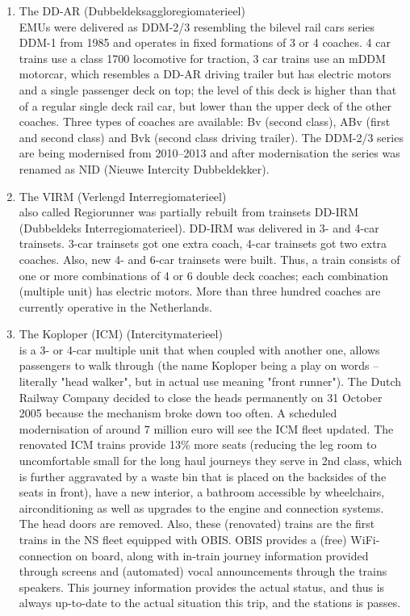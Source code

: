 \begin{enumerate}
    \item The DD-AR (Dubbeldeksaggloregiomaterieel) \\  EMUs were delivered as DDM-2/3 resembling the bilevel rail cars series DDM-1 from 1985 and operates in fixed formations of 3 or 4 coaches. 4 car trains use a class 1700 locomotive for traction, 3 car trains use an mDDM motorcar, which resembles a DD-AR driving trailer but has electric motors and a single passenger deck on top; the level of this deck is higher than that of a regular single deck rail car, but lower than the upper deck of the other coaches. Three types of coaches are available: Bv (second class), ABv (first and second class) and Bvk (second class driving trailer). The DDM-2/3 series are being modernised from 2010–2013 and after modernisation the series was renamed as NID (Nieuwe Intercity Dubbeldekker).
    \item The VIRM (Verlengd Interregiomaterieel) \\ also called Regiorunner was partially rebuilt from trainsets DD-IRM (Dubbeldeks Interregiomaterieel). DD-IRM was delivered in 3- and 4-car trainsets. 3-car trainsets got one extra coach, 4-car trainsets got two extra coaches. Also, new 4- and 6-car trainsets were built. Thus, a train consists of one or more combinations of 4 or 6 double deck coaches; each combination (multiple unit) has electric motors. More than three hundred coaches are currently operative in the Netherlands.
    \item The Koploper (ICM) (Intercitymaterieel) \\ is a 3- or 4-car multiple unit that when coupled with another one, allows passengers to walk through (the name Koploper being a play on words – literally "head walker", but in actual use meaning "front runner"). The Dutch Railway Company decided to close the heads permanently on 31 October 2005 because the mechanism broke down too often. A scheduled modernisation of around 7 million euro will see the ICM fleet updated. The renovated ICM trains provide 13\% more seats (reducing the leg room to uncomfortable small for the long haul journeys they serve in 2nd class, which is further aggravated by a waste bin that is placed on the backsides of the seats in front), have a new interior, a bathroom accessible by wheelchairs, airconditioning as well as upgrades to the engine and connection systems. The head doors are removed. Also, these (renovated) trains are the first trains in the NS fleet equipped with OBIS. OBIS provides a (free) WiFi-connection on board, along with in-train journey information provided through screens and (automated) vocal announcements through the trains speakers. This journey information provides the actual status, and thus is always up-to-date to the actual situation this trip, and the stations is passes.

\end{enumerate}
